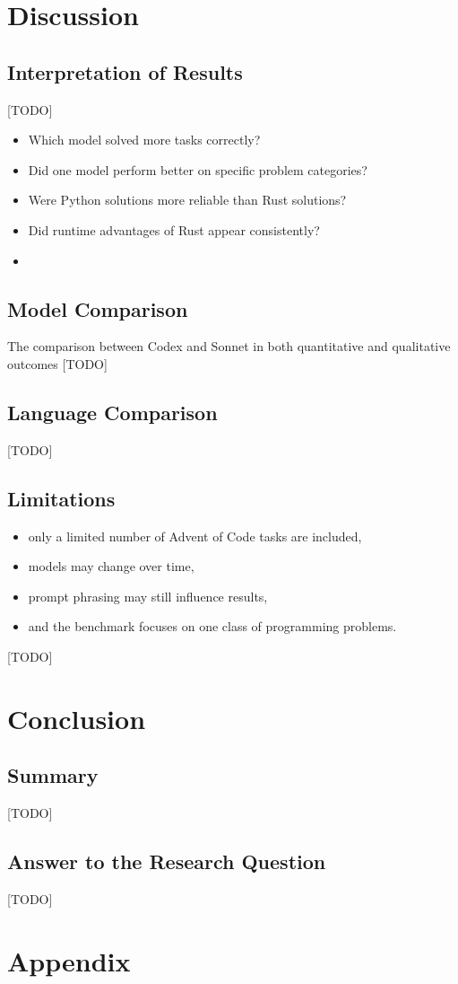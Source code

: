 \documentclass[12pt,a4paper]{report}
\begin{document}
\chapter{Discussion}

\section{Interpretation of Results} [TODO]
\begin{itemize}
    \item Which model solved more tasks correctly?
    \item Did one model perform better on specific problem categories?
    \item Were Python solutions more reliable than Rust solutions?
    \item Did runtime advantages of Rust appear consistently?
    \item [...]
\end{itemize}

\section{Model Comparison}
The comparison between Codex and Sonnet in both quantitative and qualitative outcomes [TODO]

\section{Language Comparison}
[TODO]



\section{Limitations}

\begin{itemize}
    \item only a limited number of Advent of Code tasks are included,
    \item models may change over time,
    \item prompt phrasing may still influence results,
    \item and the benchmark focuses on one class of programming problems.
\end{itemize}
[TODO]


\chapter{Conclusion}

\section{Summary}
[TODO]

\section{Answer to the Research Question}
[TODO]


\appendix

\chapter{Appendix}


\printbibliography
\end{document}
